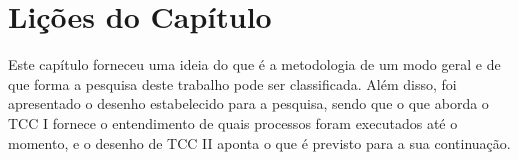 \section{Lições do Capítulo} \label{sec:licMetodo}


Este capítulo forneceu uma ideia do que é a metodologia de um modo geral e de que forma a pesquisa deste trabalho pode ser classificada. 
Além disso, foi apresentado o desenho estabelecido para a pesquisa, sendo que o que aborda o \ac{TCC} I fornece o entendimento de quais processos foram executados até o momento, e o desenho de \ac{TCC} II aponta o que é  previsto para a sua continuação. 

